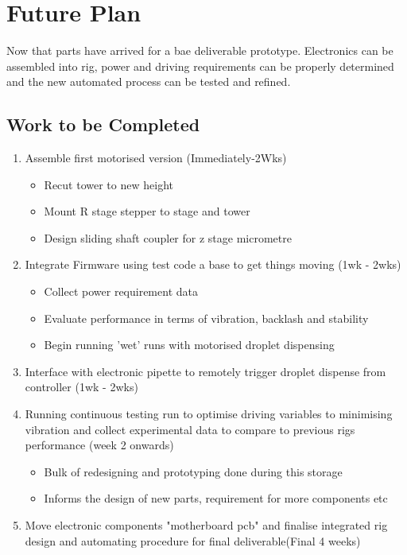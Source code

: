 \chapter{Future Plan}\label{C:fut} 
Now that parts have arrived for a bae deliverable prototype. Electronics can be assembled into rig, power and driving requirements can be properly determined and the new automated process can be tested and refined.

\section{Work to be Completed}
\begin{enumerate}
    \item Assemble first motorised version (Immediately-2Wks)
    \begin{itemize}
        \item Recut tower to new height
        \item Mount R stage stepper to stage and tower 
        \item Design sliding shaft coupler for z stage micrometre
    \end{itemize}
    \item Integrate Firmware using test code a base to get things moving (1wk - 2wks)
    \begin{itemize}
        \item Collect power requirement data
        \item Evaluate performance in terms of vibration, backlash and stability
        \item Begin running 'wet' runs with motorised droplet dispensing
    \end{itemize}
    \item Interface with electronic pipette to remotely trigger droplet dispense from controller (1wk - 2wks)
    \item Running continuous testing run to optimise driving variables to minimising vibration and collect experimental data to compare to previous rigs performance (week 2 onwards)
    \begin{itemize}
        \item Bulk of redesigning and prototyping done during this storage
        \item Informs the design of new parts, requirement for more components etc
    \end{itemize}
    \item Move electronic components "motherboard pcb" and finalise integrated rig design and automating procedure for final deliverable(Final 4 weeks)
\end{enumerate}